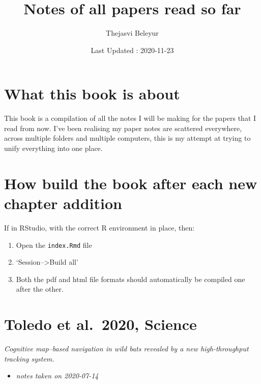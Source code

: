 \documentclass[
]{book}
\title{Notes of all papers read so far}
\author{Thejasvi Beleyur}
\date{Last Updated : 2020-11-23}
\providecommand{\tightlist}{%
  \setlength{\itemsep}{0pt}\setlength{\parskip}{0pt}}
\begin{document}
\maketitle

{
\setcounter{tocdepth}{1}
\tableofcontents
}
\hypertarget{what-this-book-is-about}{%
\chapter*{What this book is about}\label{what-this-book-is-about}}

This book is a compilation of all the notes I will be making for the papers that I read from now.
I've been realising my paper notes are scattered everywhere, across multiple folders and multiple computers,
this is my attempt at trying to unify everything into one place.

\hypertarget{how-build-the-book-after-each-new-chapter-addition}{%
\chapter{How build the book after each new chapter addition}\label{how-build-the-book-after-each-new-chapter-addition}}

If in RStudio, with the correct R environment in place, then:

\begin{enumerate}
\def\labelenumi{\arabic{enumi}.}
\tightlist
\item
  Open the \texttt{index.Rmd} file
\item
  `Session--\textgreater Build all'
\item
  Both the pdf and html file formats should automatically be compiled one after the other.
\end{enumerate}

\hypertarget{toledo-et-al.-2020-science}{%
\chapter{Toledo et al.~2020, Science}\label{toledo-et-al.-2020-science}}


\emph{Cognitive map--based navigation in wild bats revealed by a new high-throughput tracking system.} \citep{toledo2020cognitive}

\begin{itemize}
\tightlist
\item
  \emph{notes taken on 2020-07-14}
\end{itemize}
\end{document}
